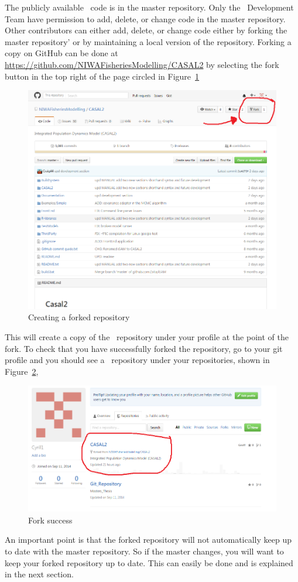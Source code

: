 The publicly available \CNAME\ code is in the master repository. Only the \CNAME\ Development Team have permission to add, delete, or change code in the master repository. Other contributors can either add, delete, or change code either by forking the master repository' or by maintaining a local version of the repository. Forking a copy on GitHub can be done at \url{https://github.com/NIWAFisheriesModelling/CASAL2} by selecting the fork button in the top right of the page circled in Figure~\ref{fig:fork}

\begin{figure}[!ht]
	\centering
	\includegraphics[scale=0.6]{Figures/Fork_button.png}
	\caption{Creating a forked repository}\label{fig:fork}
\end{figure}
\pagebreak

This will create a copy of the \CNAME\ repository under your profile at the point of the fork. To check that you have successfully forked the repository, go to your git profile and you should see a \CNAME\ repository under your repositories, shown in Figure~\ref{fig:fork_success},

\begin{figure}[!ht]
	\centering
	\includegraphics[scale=0.6]{Figures/fork_success.png}
	\caption{Fork success}\label{fig:fork_success}
\end{figure}

An important point is that the forked repository will not automatically keep up to date with the master repository. So if the master changes, you will want to keep your forked repository up to date. This can easily be done and is explained in the next section.



